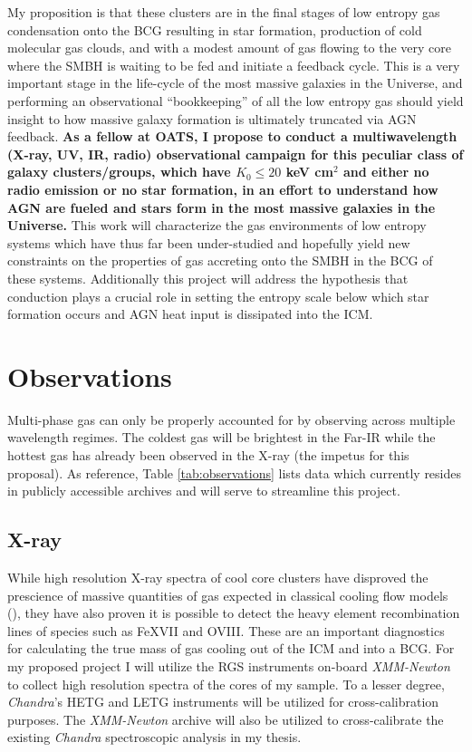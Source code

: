 \documentclass[11pt]{article}
\begin{document}
My proposition is that these clusters are in the final stages of low
entropy gas condensation onto the BCG resulting in star formation,
production of cold molecular gas clouds, and with a modest amount of
gas flowing to the very core where the SMBH is waiting to be fed and
initiate a feedback cycle. This is a very important stage in the
life-cycle of the most massive galaxies in the Universe, and
performing an observational ``bookkeeping'' of all the low entropy gas
should yield insight to how massive galaxy formation is ultimately
truncated via AGN feedback. {\bf As a fellow at OATS, I propose to
conduct a multiwavelength (X-ray, UV, IR, radio) observational
campaign for this peculiar class of galaxy clusters/groups, which have $K_0 \leq
20$ keV cm$^2$ and either no radio emission or no star formation, in an
effort to understand how AGN are fueled and stars form in the most
massive galaxies in the Universe.} This work will characterize the gas
environments of low entropy systems which have thus far been
under-studied and hopefully yield new constraints on the properties of
gas accreting onto the SMBH in the BCG of these systems. Additionally
this project will address the hypothesis that conduction plays a crucial
role in setting the entropy scale below which star formation occurs
and AGN heat input is dissipated into the ICM.

\section{Observations}
Multi-phase gas can only be properly accounted for by observing across
multiple wavelength regimes. The coldest gas will be brightest in the
Far-IR while the hottest gas has already been observed in the X-ray
(the impetus for this proposal). As reference, Table
\ref{tab:observations} lists data which currently resides in publicly
accessible archives and will serve to streamline this project.

\subsection{X-ray}
While high resolution X-ray spectra of cool core clusters have
disproved the prescience of massive quantities of gas expected in
classical cooling flow models (\cite{2006PhR...427....1P}), they have
also proven it is possible to detect the heavy element recombination lines
of species such as FeXVII and OVIII. These are an important
diagnostics for calculating the true mass of gas cooling out of the ICM
and into a BCG. For my proposed project I will utilize the RGS
instruments on-board {\it XMM-Newton} to collect high resolution
spectra of the cores of my sample. To a lesser degree, {\it Chandra}'s
HETG and LETG instruments will be utilized for cross-calibration
purposes. The {\it XMM-Newton} archive will also be utilized to 
cross-calibrate the existing {\it Chandra} spectroscopic analysis in
my thesis.
\end{document}
